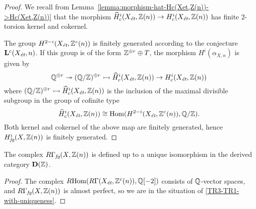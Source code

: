 \documentclass{article}
\numberwithin{equation}{section}
\begin{document}
\begin{proposition}
\begin{proof}
    We recall from Lemma~\ref{lemma:morphism-hat-Hc(Xet,Z(n))->Hc(Xet,Z(n))}
    that the morphism
    $\widehat{H}^i_c (X_\et, \ZZ (n)) \to H^i_c (X_\et, \ZZ (n))$ has finite
    $2$-torsion kernel and cokernel.

    The group $H^{2-i} (X_\et, \ZZ^c (n))$ is finitely generated
    according to the conjecture $\mathbf{L}^c (X_\et, n)$. If this
    group is of the form $\ZZ^{\oplus r}\oplus T$, the morphism
    $H^i (\alpha_{X,n})$ is given by
    $$\QQ^{\oplus r} \twoheadrightarrow (\QQ/\ZZ)^{\oplus r} \rightarrowtail \widehat{H}^i_c (X_\et, \ZZ (n)) \to H^i_c (X_\et, \ZZ (n))$$
    where
    $(\QQ/\ZZ)^{\oplus r} \rightarrowtail \widehat{H}^i_c (X_\et, \ZZ (n))$ is
    the inclusion of the maximal divisible subgroup in the group of cofinite
    type
    $$\widehat{H}^i_c (X_\et, \ZZ (n)) \cong \Hom (H^{2-i} (X_\et, \ZZ^c (n)), \QQ/\ZZ).$$
    Both kernel and cokernel of the above map are finitely generated, hence
    $H^i_\fg (X, \ZZ (n))$ is finitely generated.
  \end{proof}
\end{proposition}

\begin{proposition}
  \label{prop:RGamma-fg-uniquely-defined}
  The complex $R\Gamma_\fg (X, \ZZ (n))$ is defined up to a unique isomorphism
  in the derived category $\mathbf{D} (\ZZ)$.

  \begin{proof}
    The complex $\RHom (R\Gamma (X_\et, \ZZ^c (n)), \QQ [-2])$ consists of
    $\QQ$-vector spaces, and $R\Gamma_\fg (X, \ZZ (n))$ is almost perfect, so we
    are in the situation of \ref{TR3-TR1-with-uniqueness}.
  \end{proof}
\end{proposition}
\end{document}
